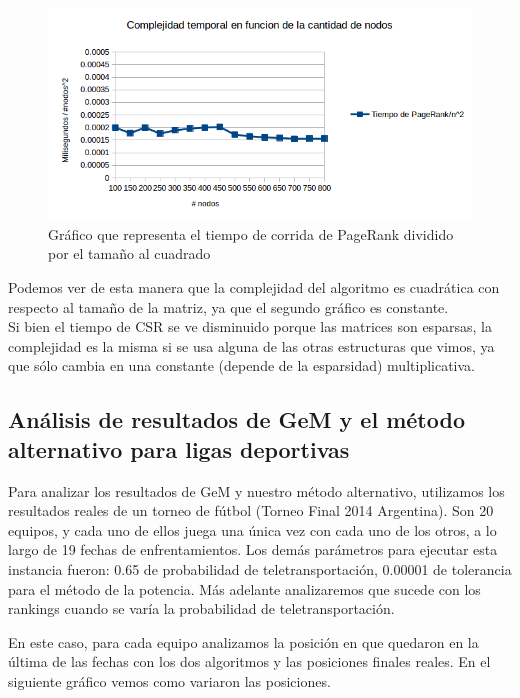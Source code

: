 \begin{figure}[h]
   \begin{center}
     \includegraphics[scale= 0.8]{imagenes/complejidadlineal.png}
   \end{center}
   \caption{Gráfico que representa el tiempo de corrida de PageRank dividido por el tamaño al cuadrado}
  \label{fig:lin}
\end{figure}

 Podemos ver de esta manera que la complejidad del algoritmo es cuadrática con respecto al tamaño de la matriz, ya que el segundo gráfico es constante. \\

Si bien el tiempo de CSR se ve disminuido porque las matrices son esparsas, la complejidad es la misma si se usa alguna de las otras estructuras que vimos, ya que sólo cambia en una constante (depende de la esparsidad) multiplicativa. \\

\newpage

\subsection{Análisis de resultados de GeM y el método alternativo para ligas deportivas}

Para analizar los resultados de GeM y nuestro método alternativo, utilizamos los resultados reales de un torneo de fútbol (Torneo Final 2014 Argentina\footnotemark). Son 20 equipos, y cada uno de ellos juega una única vez con cada uno de los otros, a lo largo de 19 fechas de enfrentamientos. Los demás parámetros para ejecutar esta instancia fueron: 0.65 de probabilidad de teletransportación, 0.00001 de tolerancia para el método de la potencia. Más adelante analizaremos que sucede con los rankings cuando se varía la probabilidad de teletransportación.

En este caso, para cada equipo analizamos la posición en que quedaron en la última de las fechas con los dos algoritmos y las posiciones finales reales. En el siguiente gráfico vemos como variaron las posiciones. 


